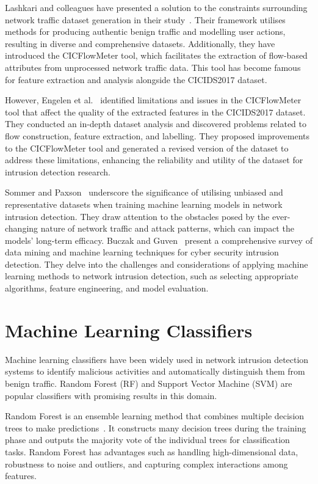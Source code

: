 Lashkari and colleagues have presented a solution to the constraints surrounding network traffic dataset generation in their study~\cite{lashkari2017characterization}. Their framework utilises methods for producing authentic benign traffic and modelling user actions, resulting in diverse and comprehensive datasets. Additionally, they have introduced the CICFlowMeter tool, which facilitates the extraction of flow-based attributes from unprocessed network traffic data. This tool has become famous for feature extraction and analysis alongside the CICIDS2017 dataset.

However, Engelen et al.~\cite{engelen2021troubleshooting} identified limitations and issues in the CICFlowMeter tool that affect the quality of the extracted features in the CICIDS2017 dataset. They conducted an in-depth dataset analysis and discovered problems related to flow construction, feature extraction, and labelling. They proposed improvements to the CICFlowMeter tool and generated a revised version of the dataset to address these limitations, enhancing the reliability and utility of the dataset for intrusion detection research.

Sommer and Paxson~\cite{sommer2010outside} underscore the significance of utilising unbiased and representative datasets when training machine learning models in network intrusion detection. They draw attention to the obstacles posed by the ever-changing nature of network traffic and attack patterns, which can impact the models' long-term efficacy. Buczak and Guven~\cite{buczak2015survey} present a comprehensive survey of data mining and machine learning techniques for cyber security intrusion detection. They delve into the challenges and considerations of applying machine learning methods to network intrusion detection, such as selecting appropriate algorithms, feature engineering, and model evaluation.

\section{Machine Learning Classifiers}\label{sec:classifiers}

Machine learning classifiers have been widely used in network intrusion detection systems to identify malicious activities and automatically distinguish them from benign traffic. Random Forest (RF) and Support Vector Machine (SVM) are popular classifiers with promising results in this domain.

Random Forest is an ensemble learning method that combines multiple decision trees to make predictions~\cite{hastie2009random}. It constructs many decision trees during the training phase and outputs the majority vote of the individual trees for classification tasks. Random Forest has advantages such as handling high-dimensional data, robustness to noise and outliers, and capturing complex interactions among features.

